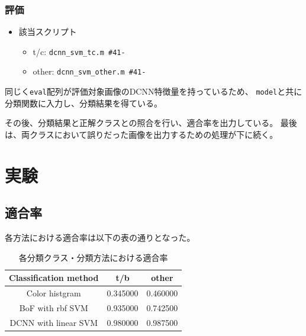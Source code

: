 \documentclass[11pt,a4paper, uplatex]{jsreport}
\begin{document}
\subsubsection{評価}
\begin{itemize}
  \item 該当スクリプト
  \begin{itemize}
    \item t/c: \texttt{dcnn_svm_tc.m \#41-}
    \item other: \texttt{dcnn_svm_other.m \#41-}
  \end{itemize}
\end{itemize}
同じく\texttt{eval}配列が評価対象画像のDCNN特徴量を持っているため、
\texttt{model}と共に分類関数に入力し、分類結果を得ている。

その後、分類結果と正解クラスとの照合を行い、適合率を出力している。
最後は、両クラスにおいて誤りだった画像を出力するための処理が下に続く。

\section{実験}
\subsection{適合率}
各方法における適合率は以下の表の通りとなった。
\begin{table}[h]
  \caption{各分類クラス・分類方法における適合率}
  \label{tb:accuracy}
  \begin{center}
    \begin{tabular}{ccc} \hline
      Classification method & t/b & other \\ \hline
      Color histgram & 0.345000 & 0.460000 \\
      BoF with rbf SVM & 0.935000 & 0.742500 \\
      DCNN with linear SVM & 0.980000 & 0.987500 \\ \hline
    \end{tabular}
  \end{center}
\end{table}
\end{document}
